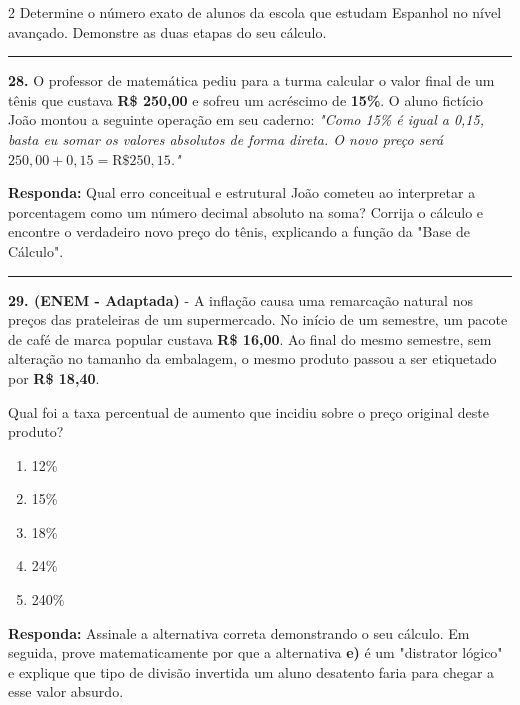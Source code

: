 \documentclass[twoside, 10pt, a4paper]{article}
\newlength{\espacoPreQuestao}
\newlength{\espacoQuestao}
\begin{document}
\begin{multicols*}{2}
Determine o número exato de alunos da escola que estudam Espanhol no nível avançado. Demonstre as duas etapas do seu cálculo.
\par\vspace{\espacoQuestao}

\noindent\textcolor{CorLinha}{\rule{\linewidth}{0.5pt}} 
\par\vspace{\espacoPreQuestao}
\textbf{28.} O professor de matemática pediu para a turma calcular o valor final de um tênis que custava \textbf{R\$ 250,00} e sofreu um acréscimo de \textbf{15\%}. O aluno fictício João montou a seguinte operação em seu caderno: \textit{"Como 15\% é igual a 0,15, basta eu somar os valores absolutos de forma direta. O novo preço será $ 250,00 + 0,15 = \text{R\$ } 250,15 $."}
\begin{boxresponda}
\textbf{Responda:} Qual erro conceitual e estrutural João cometeu ao interpretar a porcentagem como um número decimal absoluto na soma? Corrija o cálculo e encontre o verdadeiro novo preço do tênis, explicando a função da "Base de Cálculo".
\end{boxresponda}
\par\vspace{\espacoQuestao}

\noindent\textcolor{CorLinha}{\rule{\linewidth}{0.5pt}} 
\par\vspace{\espacoPreQuestao}
\textbf{29. (ENEM - Adaptada)} - A inflação causa uma remarcação natural nos preços das prateleiras de um supermercado. No início de um semestre, um pacote de café de marca popular custava \textbf{R\$ 16,00}. Ao final do mesmo semestre, sem alteração no tamanho da embalagem, o mesmo produto passou a ser etiquetado por \textbf{R\$ 18,40}.

Qual foi a taxa percentual de aumento que incidiu sobre o preço original deste produto?
\begin{enumerate}[label=\alph*)]
    \item 12\%
    \item 15\%
    \item 18\%
    \item 24\%
    \item 240\%
\end{enumerate}
\begin{boxresponda}
\textbf{Responda:} Assinale a alternativa correta demonstrando o seu cálculo. Em seguida, prove matematicamente por que a alternativa \textbf{e)} é um "distrator lógico" e explique que tipo de divisão invertida um aluno desatento faria para chegar a esse valor absurdo.
\end{boxresponda}
\par\vspace{\espacoQuestao}


\end{multicols*}
\end{document}

